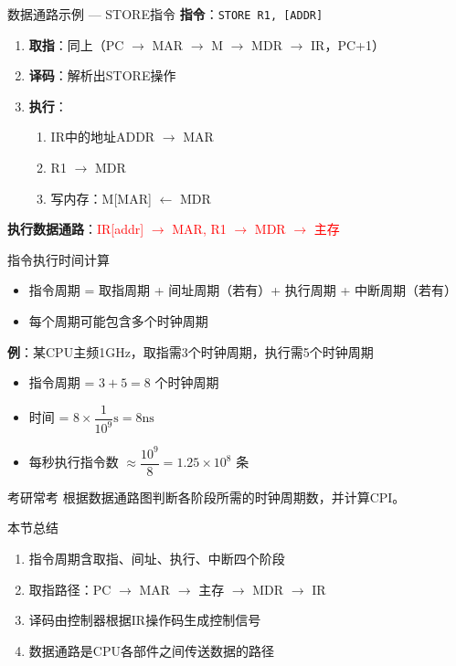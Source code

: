 \documentclass[10pt, aspectratio=169]{beamer}
\begin{document}
\begin{frame}{数据通路示例 --- STORE指令}
    \textbf{指令}：\texttt{STORE R1, [ADDR]}
    \vspace{0.3em}
    \begin{enumerate}
        \item \textbf{取指}：同上（PC $\rightarrow$ MAR $\rightarrow$ M $\rightarrow$ MDR $\rightarrow$ IR，PC+1）
        \item \textbf{译码}：解析出STORE操作
        \item \textbf{执行}：
            \begin{enumerate}
                \item IR中的地址ADDR $\rightarrow$ MAR
                \item R1 $\rightarrow$ MDR
                \item 写内存：M[MAR] $\leftarrow$ MDR
            \end{enumerate}
    \end{enumerate}
    \vspace{0.3em}
    \begin{center}
        \textbf{执行数据通路}：\textcolor{red}{IR[addr] $\rightarrow$ MAR, R1 $\rightarrow$ MDR $\rightarrow$ 主存}
    \end{center}
\end{frame}

\begin{frame}[fragile]{指令执行时间计算}
    \begin{itemize}
        \item 指令周期 = 取指周期 + 间址周期（若有）+ 执行周期 + 中断周期（若有）
        \item 每个周期可能包含多个时钟周期
    \end{itemize}
    \vspace{0.3em}
    \textbf{例}：某CPU主频1GHz，取指需3个时钟周期，执行需5个时钟周期
    \vspace{0.3em}
    \begin{itemize}
        \item 指令周期 = $3 + 5 = 8$ 个时钟周期
        \item 时间 = $8 \times \dfrac{1}{10^9}\text{s} = 8\text{ns}$
        \item 每秒执行指令数 $\approx \dfrac{10^9}{8} = 1.25 \times 10^8$ 条
    \end{itemize}
    \vspace{0.3em}
    \begin{block}{考研常考}
        根据数据通路图判断各阶段所需的时钟周期数，并计算CPI。
    \end{block}
\end{frame}

\begin{frame}{本节总结}
    \begin{enumerate}
        \item 指令周期含取指、间址、执行、中断四个阶段
        \item 取指路径：PC $\rightarrow$ MAR $\rightarrow$ 主存 $\rightarrow$ MDR $\rightarrow$ IR
        \item 译码由控制器根据IR操作码生成控制信号
        \item 数据通路是CPU各部件之间传送数据的路径
    \end{enumerate}
\end{frame}
\end{document}
